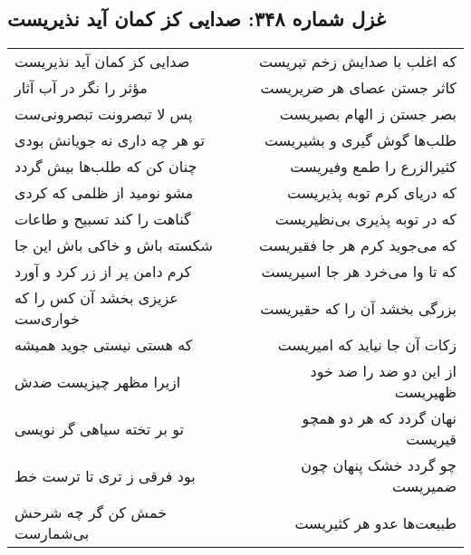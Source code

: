 \begin{center}
\section*{غزل شماره ۳۴۸: صدایی کز کمان آید نذیریست}
\label{sec:0348}
\begin{longtable}{l p{0.5cm} r}
صدایی کز کمان آید نذیریست
&&
که اغلب با صدایش زخم تیریست
\\
مؤثر را نگر در آب آثار
&&
کاثر جستن عصای هر ضریریست
\\
پس لا تبصرونت تبصرونی‌ست
&&
بصر جستن ز الهام بصیریست
\\
تو هر چه داری نه جویانش بودی
&&
طلب‌ها گوش گیری و بشیریست
\\
چنان کن که طلب‌ها بیش گردد
&&
کثیرالزرع را طمع وفیریست
\\
مشو نومید از ظلمی که کردی
&&
که دریای کرم توبه پذیریست
\\
گناهت را کند تسبیح و طاعات
&&
که در توبه پذیری بی‌نظیریست
\\
شکسته باش و خاکی باش این جا
&&
که می‌جوید کرم هر جا فقیریست
\\
کرم دامن پر از زر کرد و آورد
&&
که تا وا می‌خرد هر جا اسیریست
\\
عزیزی بخشد آن کس را که خواری‌ست
&&
بزرگی بخشد آن را که حقیریست
\\
که هستی نیستی جوید همیشه
&&
زکات آن جا نیاید که امیریست
\\
ازیرا مظهر چیزیست ضدش
&&
از این دو ضد را ضد خود ظهیریست
\\
تو بر تخته سیاهی گر نویسی
&&
نهان گردد که هر دو همچو قیریست
\\
بود فرقی ز تری تا ترست خط
&&
چو گردد خشک پنهان چون ضمیریست
\\
خمش کن گر چه شرحش بی‌شمارست
&&
طبیعت‌ها عدو هر کثیریست
\\
\end{longtable}
\end{center}
